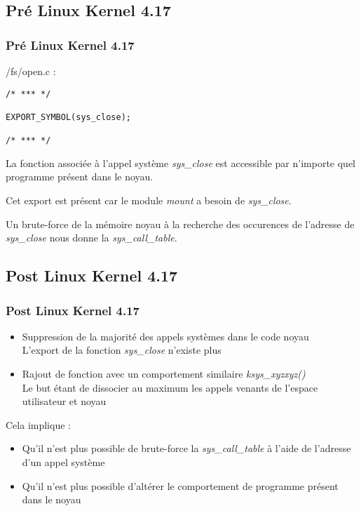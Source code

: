 \documentclass{beamer}
\begin{document}
\subsection{Pré Linux Kernel 4.17}

\begin{frame}[fragile]
\frametitle{Pré Linux Kernel 4.17}
/fs/open.c :
\begin{lstlisting}[style=CStyle]
/* *** */

EXPORT_SYMBOL(sys_close);

/* *** */
\end{lstlisting}
\medskip
La fonction associée à l'appel système \textit{sys\_close} est accessible par n'importe quel programme présent dans le noyau.

Cet export est présent car le module \textit{mount} a besoin de \textit{sys\_close}.

\medskip
Un brute-force de la mémoire noyau à la recherche des occurences de l'adresse de \textit{sys\_close} nous donne la \textit{sys\_call\_table}.
\end{frame}

\subsection{Post Linux Kernel 4.17}

\begin{frame}
\frametitle{Post Linux Kernel 4.17}
\begin{itemize}
\item 	Suppression de la majorité des appels systèmes dans le code noyau\\
	L'export de la fonction \textit{sys\_close} n'existe plus\\
\item 	Rajout de fonction avec un comportement similaire \textit{ksys\_xyzxyz()}\\
	Le but étant de dissocier au maximum les appels venants de l'espace utilisateur et noyau
\end{itemize}
Cela implique :
\begin{itemize}
\item 	Qu'il n'est plus possible de brute-force la \textit{sys\_call\_table} à l'aide de l'adresse d'un appel système
\item 	Qu'il n'est plus possible d'altérer le comportement de programme présent dans le noyau
\end{itemize}
\end{frame}
\end{document}
